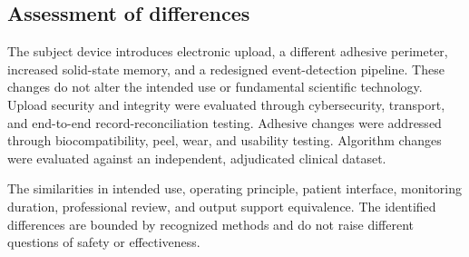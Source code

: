 \subsection{Assessment of differences}
The subject device introduces electronic upload, a different adhesive perimeter, increased solid-state memory, and a redesigned event-detection pipeline. These changes do not alter the intended use or fundamental scientific technology. Upload security and integrity were evaluated through cybersecurity, transport, and end-to-end record-reconciliation testing. Adhesive changes were addressed through biocompatibility, peel, wear, and usability testing. Algorithm changes were evaluated against an independent, adjudicated clinical dataset.

\begin{noticebox}[title={\bfseries Substantial-equivalence determination}]
The similarities in intended use, operating principle, patient interface, monitoring duration, professional review, and output support equivalence. The identified differences are bounded by recognized methods and do not raise different questions of safety or effectiveness.
\end{noticebox}

